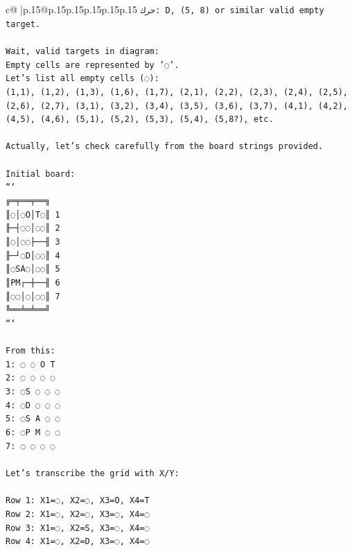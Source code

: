 \documentclass{article}
\begin{document}
{\begin{supertabular}{c@{$\;$}|p{.15\linewidth}@{}p{.15\linewidth}p{.15\linewidth}p{.15\linewidth}p{.15\linewidth}p{.15\linewidth}}
{{{\texttt{حرك: D, (5, 8) or similar valid empty target.} \\
\\ 
\texttt{Wait, valid targets in diagram:} \\
\texttt{Empty cells are represented by '◌'.} \\
\texttt{Let's list all empty cells (◌):} \\
\texttt{(1,1), (1,2), (1,3), (1,6), (1,7), (2,1), (2,2), (2,3), (2,4), (2,5), (2,6), (2,7), (3,1), (3,2), (3,4), (3,5), (3,6), (3,7), (4,1), (4,2), (4,5), (4,6), (5,1), (5,2), (5,3), (5,4), (5,8?), etc.} \\
\\ 
\texttt{Actually, let's check carefully from the board strings provided.} \\
\\ 
\texttt{Initial board:} \\
\texttt{```} \\
\texttt{╔═╤══╤══╗} \\
\texttt{║◌│◌O│T◌║ 1} \\
\texttt{╟─┤◌◌│◌◌║ 2} \\
\texttt{║◌│◌◌├──╢ 3} \\
\texttt{╟─┘◌D│◌◌║ 4} \\
\texttt{║◌SA◌│◌◌║ 5} \\
\texttt{║PM┌─┼──╢ 6} \\
\texttt{║◌◌│◌│◌◌║ 7} \\
\texttt{╚══╧═╧══╝} \\
\texttt{```} \\
\\ 
\texttt{From this:} \\
\texttt{1: ◌ ◌ O T} \\
\texttt{2: ◌ ◌ ◌ ◌} \\
\texttt{3: ◌S ◌ ◌ ◌} \\
\texttt{4: ◌D ◌ ◌ ◌} \\
\texttt{5: ◌S A ◌ ◌} \\
\texttt{6: ◌P M ◌ ◌} \\
\texttt{7: ◌ ◌ ◌ ◌} \\
\\ 
\texttt{Let's transcribe the grid with X/Y:} \\
\\ 
\texttt{Row 1: X1=◌, X2=◌, X3=O, X4=T} \\
\texttt{Row 2: X1=◌, X2=◌, X3=◌, X4=◌} \\
\texttt{Row 3: X1=◌, X2=S, X3=◌, X4=◌} \\
\texttt{Row 4: X1=◌, X2=D, X3=◌, X4=◌} \\
}}}
\end{supertabular}}
\end{document}
